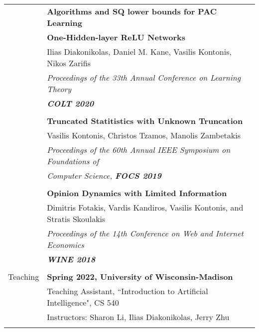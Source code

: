 \documentclass[letterpaper,11pt,oneside]{article}
\begin{document}
\begin{longtable}{@{} l l}
     &\textbf{Algorithms and SQ lower bounds for PAC Learning} \\
     & \textbf{One-Hidden-layer ReLU Networks}\\
     & Ilias Diakonikolas, Daniel M. Kane, Vasilis Kontonis, Nikos Zarifis \\
     & \emph{Proceedings of the 33th Annual Conference on Learning Theory} \\
     & \emph{\textbf{COLT 2020}} \\
     & \\

     & \textbf{Truncated Statitistics with Unknown Truncation} \\
     & Vasilis Kontonis, Christos Tzamos, Manolis Zambetakis\\
     & \emph{Proceedings of the 60th Annual IEEE Symposium on Foundations of}\\
     & \emph{Computer Science, \textbf{FOCS 2019}}\\
     & \\


     & \textbf{Opinion Dynamics with Limited Information} \\
     & Dimitris Fotakis, Vardis Kandiros, Vasilis Kontonis, and Stratis Skoulakis\\
     & \emph{Proceedings of the 14th Conference on Web and Internet Economics} \\
     & \emph{\textbf{WINE 2018}} \\
     & \\


  \Large{Teaching}

  & \textbf{Spring 2022, University of Wisconsin-Madison} \\
  & Teaching Assistant, ``Introduction to Artificial Intelligence", CS 540\\
  & Instructors: Sharon Li, Ilias Diakonikolas, Jerry Zhu \\
  & \\


\end{longtable}
\end{document}
